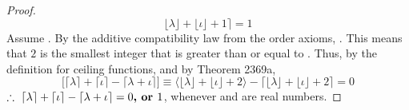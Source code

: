 \documentclass[preview]{standalone}
\begin{document}
\begin{proof}
\begin{equation*}
            \lfloor \lambda \rfloor 
                + 
            \lfloor \iota \rfloor 
                + 
            1
        \Big \rceil
            = 
        1
    \end{equation*} 
     Assume 
    . 
    By the additive compatibility law from the order axioms,
    . 
    This means that $2$ is the smallest integer that is greater than or equal to
    .
    Thus, by the definition for ceiling functions, 
    and by Theorem 2369a,
    \begin{equation*}
        \Big[ 
            \lceil \lambda \rceil 
                + 
            \lceil \iota \rceil 
                - 
            \lceil \lambda + \iota \rceil 
        \Big]
            \equiv
        \Big \langle \lfloor \lambda \rfloor + \lfloor \iota \rfloor + 2 \Big \rangle
            - 
        \Big \lceil
            \lfloor \lambda \rfloor 
                + 
            \lfloor \iota \rfloor 
                + 
            2
        \Big \rceil
            = 
        0
    \end{equation*} 
    $\therefore \text{\space} \relax{
        \lceil \lambda \rceil 
            + 
        \lceil \iota \rceil 
            - 
        \lceil \lambda + \iota \rceil 
            = 
        0
            \textbf{, or } 
        1
    }$, whenever \bm{$\lambda$} and \bm{$\iota$} are real 
    numbers.
\color{lightgray} \end{proof}
\end{document}

